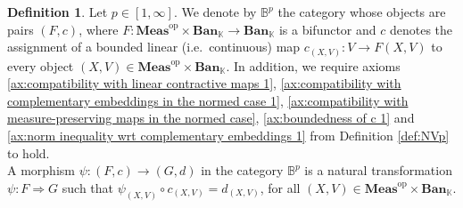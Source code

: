 \documentclass{amsart}
\theoremstyle{definition}
\newtheorem{definition}{Definition}[section]
\theoremstyle{plain}
\newcommand{\opMeas}{\mathbf{Meas}^\mathrm{op}}
\newcommand{\Ban}{\mathbf{Ban}_{\mathbb{K}}}
\newcommand{\Bp}{\mathbb{B}^p}
\begin{document}
        \begin{definition}
        \label{def:Bp}
            Let $p \in [1,\infty]$. 
            We denote by $\Bp$ the category whose objects are pairs $(F,c)$, where $F \colon \opMeas \times \Ban \rightarrow \Ban$ is a bifunctor and $c$ denotes the assignment of a bounded linear (i.e.~continuous) map $c_{(X,V)} \colon V \rightarrow F(X,V)$ to every object $(X,V) \in \opMeas \times \Ban$. 
            In addition, we require axioms \ref{ax:compatibility with linear contractive maps 1}, \ref{ax:compatibility with complementary embeddings in the normed case 1}, \ref{ax:compatibility with measure-preserving maps in the normed case}, \ref{ax:boundedness of c 1} and \ref{ax:norm inequality wrt complementary embeddings 1} from Definition \ref{def:NVp} to hold. \\
            A morphism $\psi \colon (F,c) \rightarrow (G,d)$ in the category $\Bp$ is a natural transformation $\psi \colon F \Rightarrow G$ such that $\psi_{(X,V)} \circ c_{(X,V)} = d_{(X,V)}$, for all $(X,V) \in \opMeas \times \Ban$.
        \end{definition}
\end{document}
